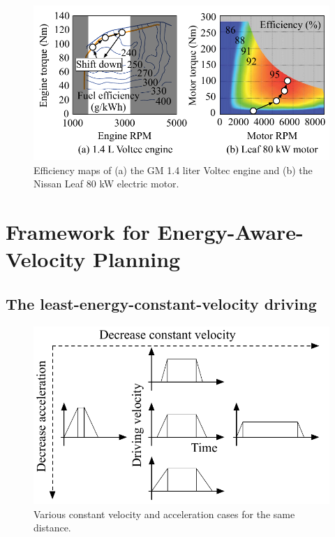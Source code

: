 \documentclass{IEEEtran}
\begin{document}
\begin{figure}	%
\includegraphics[width=1.0\hsize]{Figures/efficiency_maps.pdf}
\caption{Efficiency maps of (a) the GM 1.4 liter Voltec engine and (b) the Nissan Leaf 80 kW electric motor.}
\label{fig:efficiency_map}
\end{figure} 

\section{Framework for Energy-Aware-Velocity Planning} \label{sec:framework}

\subsection{The least-energy-constant-velocity driving} \label{subsec:constant drive}

\begin{figure} %
\centering
\includegraphics[width=0.85\hsize]{Figures/const_vel_drive_problem.pdf}
\caption{Various constant velocity and acceleration cases for the same distance.}
\label{fig:const_vel_drive_problem}
\end{figure} 
\end{document}
